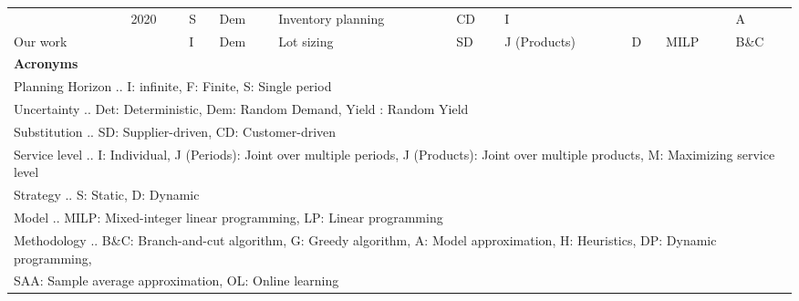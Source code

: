 \begin{table}[ht]
\begin{adjustbox}{width=1\textwidth,center=\textwidth}
\begin{tabular}{llllllllll}
\citeauthor{akccaycategory}               & 2020                                    & S                                       & Dem                               & Inventory planning                                 &CD                  & I                            &                & & A\\
Our work                  &                                         & I                                       & Dem                               & Lot sizing                      & SD                  & J (Products)                 & D              & MILP                &           B\&C   

\\
\midrule
\textbf{Acronyms}                  &                                         &                                         &                                   &                                 &                     &                              &                &                           &              \\
\multicolumn{10}{l}{Planning Horizon ..          I: infinite,                              F: Finite,                               S: Single period}                                           \\
\multicolumn{10}{l}{
Uncertainty ..               Det: Deterministic,                       Dem: Random Demand,                      Yield : Random Yield}\\

\multicolumn{10}{l}{
Substitution ..              SD: Supplier-driven,                          CD: Customer-driven }                                     \\
\multicolumn{10}{l}{
Service level  ..            I: Individual,                            J (Periods): Joint over multiple periods,  J (Products): Joint over multiple   products,  M: Maximizing service level  }         \\
\multicolumn{10}{l}{
Strategy    ..               S: Static,                                D: Dynamic  }               \\
\multicolumn{10}{l}{
Model   ..             MILP: Mixed-integer linear programming,  LP: Linear programming }             \\

\multicolumn{10}{l}{
 Methodology .. B\&C: Branch-and-cut algorithm,             G: Greedy algorithm,  A: Model approximation,    H: Heuristics, DP: Dynamic programming,                         } \\
\multicolumn{10}{l}{ SAA: Sample average approximation, OL: Online learning  }               \\
  \bottomrule
\end{tabular}
\end{adjustbox}
\label{tab:litRev}
\end{table}